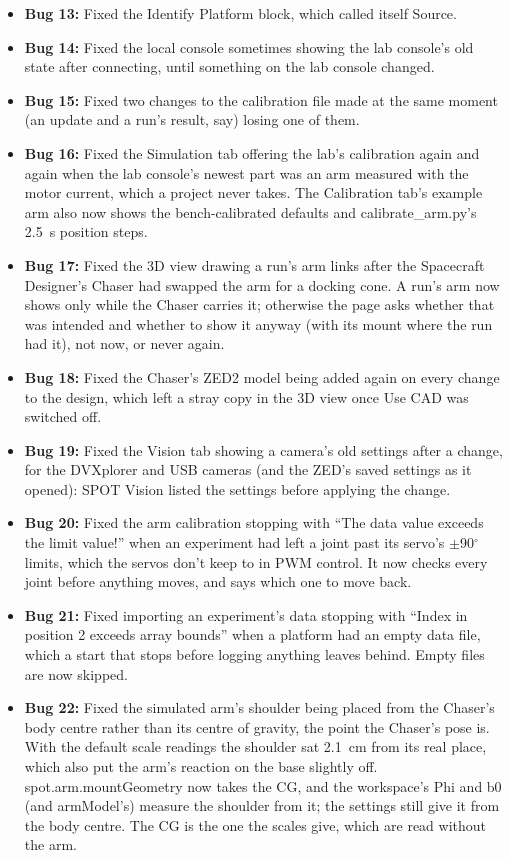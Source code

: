 \documentclass[11pt]{article}
\begin{document}
\begin{itemize}[label={\textcolor{primaryColor}{\textbullet}}]
    \item \textbf{Bug 13:} Fixed the Identify Platform block, which called itself Source.
    \item \textbf{Bug 14:} Fixed the local console sometimes showing the lab console's old state after connecting, until something on the lab console changed.
    \item \textbf{Bug 15:} Fixed two changes to the calibration file made at the same moment (an update and a run's result, say) losing one of them.
    \item \textbf{Bug 16:} Fixed the Simulation tab offering the lab's calibration again and again when the lab console's newest part was an arm measured with the motor current, which a project never takes. The Calibration tab's example arm also now shows the bench-calibrated defaults and calibrate\_arm.py's 2.5~s position steps.
    \item \textbf{Bug 17:} Fixed the 3D view drawing a run's arm links after the Spacecraft Designer's Chaser had swapped the arm for a docking cone. A run's arm now shows only while the Chaser carries it; otherwise the page asks whether that was intended and whether to show it anyway (with its mount where the run had it), not now, or never again.
    \item \textbf{Bug 18:} Fixed the Chaser's ZED2 model being added again on every change to the design, which left a stray copy in the 3D view once Use CAD was switched off.
    \item \textbf{Bug 19:} Fixed the Vision tab showing a camera's old settings after a change, for the DVXplorer and USB cameras (and the ZED's saved settings as it opened): SPOT Vision listed the settings before applying the change.
    \item \textbf{Bug 20:} Fixed the arm calibration stopping with ``The data value exceeds the limit value!'' when an experiment had left a joint past its servo's $\pm$90$^\circ$ limits, which the servos don't keep to in PWM control. It now checks every joint before anything moves, and says which one to move back.
    \item \textbf{Bug 21:} Fixed importing an experiment's data stopping with ``Index in position 2 exceeds array bounds'' when a platform had an empty data file, which a start that stops before logging anything leaves behind. Empty files are now skipped.
    \item \textbf{Bug 22:} Fixed the simulated arm's shoulder being placed from the Chaser's body centre rather than its centre of gravity, the point the Chaser's pose is. With the default scale readings the shoulder sat 2.1~cm from its real place, which also put the arm's reaction on the base slightly off. spot.arm.mountGeometry now takes the CG, and the workspace's Phi and b0 (and armModel's) measure the shoulder from it; the settings still give it from the body centre. The CG is the one the scales give, which are read without the arm.

\end{itemize}
\end{document}
